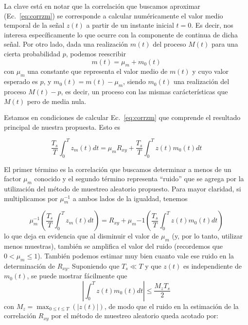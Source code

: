 \documentclass{article}
\begin{document}
La clave está en notar que la correlación que buscamos aproximar (Ec.~\ref{eq:corrzm}) se corresponde a calcular numéricamente el valor medio temporal de la señal $z(t)$ a partir de un instante inicial $t=0$. Es decir, nos interesa específicamente lo que ocurre con la componente de continua de dicha señal. Por otro lado, dada una realización $m(t)$ del proceso $M(t)$ para una cierta probabilidad $p$, podemos reescribir 
\begin{equation}
    m(t) = \mu_m + m_0(t)
\end{equation}
con $\mu_m$ una constante que representa el valor medio de $m(t)$ y cuyo valor esperado es $p$, y $m_0(t) = m(t)-\mu_m$, siendo $m_0(t)$ una realización del proceso $M(t) - p$, es decir, un proceso con las mismas carácterísticas que $M(t)$ pero de media nula.

Estamos en condiciones de calcular Ec.~\ref{eq:corrzm} que comprende el resultado principal de nuestra propuesta. Esto es

\begin{equation}
    \frac{T_s}{T} \int_0^T z_m(t) dt = \mu_m R_{xy} + \frac{T_s}{T} \int_0^T z(t) m_0(t) dt
\end{equation}

El primer término es la correlación que buscamos determinar a menos de un factor $\mu_m$ conocido y el segundo término representa ``ruido'' que se agrega por la utilización del método de muestreo aleatorio propuesto. Para mayor claridad, si multiplicamos por $\mu_m^{-1}$ a ambos lados de la igualdad, tenemos

\begin{equation}
    \mu_m^{-1} \left(\frac{T_s}{T} \int_0^T z_m(t) dt \right) = R_{xy} + \mu_m{-1} \left(\frac{T_s}{T} \int_0^T z(t) m_0(t) dt \right)
\end{equation}
lo que deja en evidencia que al disminuir el valor de $\mu_m$ (y, por lo tanto, utilizar menos muestras), también se amplifica el valor del ruido (recordemos que $0<\mu_m \leq 1$). También podemos estimar muy bien cuanto vale ese ruido en la determinación de $R_{xy}$. Suponiendo que $T_s \ll T$ y que $z(t)$ es independiente de $m_0(t)$, se puede mostrar fácilmente que
\begin{equation}
    \left|\int_0^T z(t) m_0(t) dt \right| \leq \frac{M_z T_s}{2}
\end{equation}
con $M_z=\max_{0 \leq t \leq T} (|z(t)|)$, de modo que el ruido en la estimación de la correlación $R_{xy}$ por el método de muestreo aleatorio queda acotado por:
\end{document}
